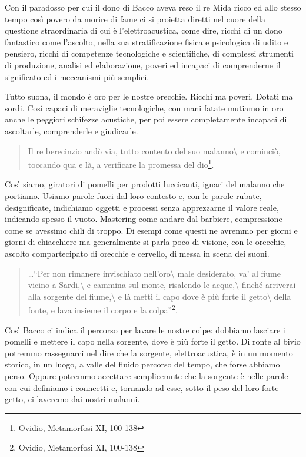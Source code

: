\documentclass[a4paper,11pt]{article}
\begin{document}
Con il paradosso per cui il dono di Bacco aveva reso il re Mida ricco ed
allo stesso tempo così povero da morire di fame ci si proietta diretti
nel cuore della questione straordinaria di cui è l'elettroacustica, come
dire, ricchi di un dono fantastico come l'ascolto, nella sua
stratificazione fisica e psicologica di udito e pensiero, ricchi di
competenze tecnologiche e scientifiche, di complessi strumenti di
produzione, analisi ed elaborazione, poveri ed incapaci di comprenderne
il significato ed i meccanismi più semplici.

Tutto suona, il mondo è oro per le nostre orecchie. Ricchi ma poveri.
Dotati ma sordi. Così capaci di meraviglie tecnologiche, con mani fatate
mutiamo in oro anche le peggiori schifezze acustiche, per poi essere
completamente incapaci di ascoltarle, comprenderle e giudicarle.

\begin{quote}
Il re berecinzio andò via, tutto contento del suo malanno\textbackslash{}
e cominciò, toccando qua e là, a verificare la promessa del dio\footnote{Ovidio, Metamorfosi XI, 100-138}.
\end{quote}

Così siamo, giratori di pomelli per prodotti luccicanti, ignari del
malanno che portiamo. Usiamo parole fuori dal loro contesto e, con le
parole rubate, designificate, indichiamo oggetti e processi senza
apprezzarne il valore reale, indicando spesso il vuoto. Mastering come
andare dal barbiere, compressione come se avessimo chili di troppo. Di
esempi come questi ne avremmo per giorni e giorni di chiacchiere ma
generalmente si parla poco di visione, con le orecchie, ascolto
compartecipato di orecchie e cervello, di messa in scena dei suoni.

\begin{quote}
\ldots{}``Per non rimanere invischiato nell'oro\textbackslash{}
male desiderato, va' al fiume vicino a Sardi,\textbackslash{}
e cammina sul monte, risalendo le acque,\textbackslash{}
finché arriverai alla sorgente del fiume,\textbackslash{}
e là metti il capo dove è più forte il getto\textbackslash{}
della fonte, e lava insieme il corpo e la colpa''\footnote{Ovidio, Metamorfosi XI, 100-138}.
\end{quote}

Così Bacco ci indica il percorso per lavare le nostre colpe: dobbiamo
lasciare i pomelli e mettere il capo nella sorgente, dove è più forte il
getto. Di ronte al bivio potremmo rassegnarci nel dire che la sorgente,
elettroacustica, è in un momento storico, in un luogo, a valle del
fluido percorso del tempo, che forse abbiamo perso. Oppure potremmo
accettare semplicemnte che la sorgente è nelle parole con cui definiamo
i conncetti e, tornando ad esse, sotto il peso del loro forte getto, ci
laveremo dai nostri malanni.
\end{document}
